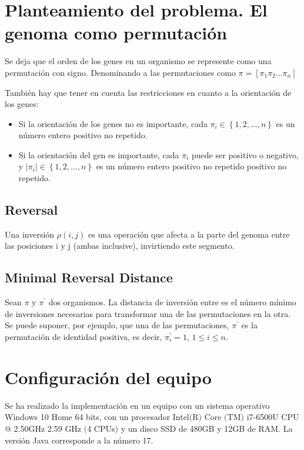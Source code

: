 \documentclass[11pt,letterpaper]{article}
\begin{document}
\section{Planteamiento del problema. El genoma como permutación}
Se deja que el orden de los genes en un organismo se represente como una permutación con signo. Denominando a las permutaciones como $\pi = \left [ \pi_1 \pi_2 ... \pi_n \right ]$

También hay que tener en cuenta las restricciones en cuanto a la orientación de los genes:

\begin{itemize}
	\item Si la orientación de los genes no es importante, cada $\pi_i \in \left \{ 1, 2, ..., n \right \}$ es un número entero positivo no repetido.
	\item Si la orientación del gen es importante, cada $\pi_i$ puede ser positivo o negativo, y $\left |\pi_i\right | \in \left \{ 1, 2, ..., n \right \}$ es un número entero positivo no repetido positivo no repetido.
\end{itemize}

\subsection{Reversal}

Una inversión $\rho (i, j)$ es una operación que afecta a la parte del genoma entre las posiciones i y j (ambas inclusive), invirtiendo este segmento.

\subsection{Minimal Reversal Distance}

Sean $\pi$ y $\pi^{'}$ dos organismos. La distancia de inversión entre es el número mínimo de inversiones necesarias para transformar una de las permutaciones en la otra.
Se puede suponer, por ejemplo, que una de las permutaciones, $\pi^{'}$ es la permutación de identidad positiva, es decir, $\pi^{'}_i = 1$, $1 \leqslant i \leqslant n $.

\section{Configuración del equipo}
Se ha realizado la implementación en un equipo con un sistema operativo Windows 10 Home 64 bits, con un procesador Intel$($R$)$ Core $($TM$)$ i7-6500U CPU $@$ 2.50GHz 2.59 GHz $($4 CPUs$)$ y un disco SSD de 480GB y 12GB de RAM. La versión Java corresponde a la número 17.
\end{document}
